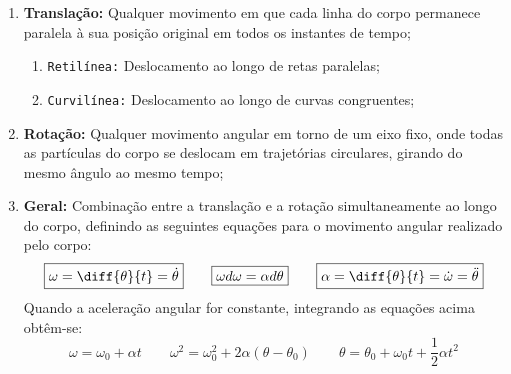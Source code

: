 \documentclass{article}
\begin{document}
                \begin{enumerate}[rightmargin = \leftmargin]
                    \item \textbf{Translação:} Qualquer movimento em que cada linha do corpo permanece paralela à sua posição original em todos os instantes de tempo;
                        \begin{enumerate}[rightmargin = \leftmargin, noitemsep]
                            \item \texttt{Retilínea:} Deslocamento ao longo de retas paralelas;
                            \item \texttt{Curvilínea:} Deslocamento ao longo de curvas congruentes;
                        \end{enumerate}

                    \item \textbf{Rotação:} Qualquer movimento angular em torno de um eixo fixo, onde todas as partículas do corpo se deslocam em trajetórias circulares, girando do mesmo ângulo ao mesmo tempo;

                    \item \textbf{Geral:} Combinação entre a translação e a rotação simultaneamente ao longo do corpo, definindo as seguintes equações para o movimento angular realizado pelo corpo:
                        \begin{equation}
                            \boxed{
                                \omega = \diff{\theta}{t} = \dot{\theta}
                            }
                            \qquad
                            \boxed{
                                \omega d \omega =\alpha d\theta
                            }
                            \qquad
                            \boxed{
                                \alpha = \diff{\theta}{t} = \dot{\omega} = \ddot{\theta}
                            }
                        \end{equation}
                    Quando a aceleração angular for constante, integrando as equações acima obtêm-se:
                        \begin{equation}
                            \boxed{
                                \omega = \omega_{0} + \alpha t
                            }
                            \qquad
                            \boxed{
                                \omega^{2} = \omega^{2}_{0} + 2\alpha(\theta - \theta_{0})
                            }
                            \qquad
                            \boxed{
                                \theta = \theta_{0} + \omega_{0} t + \frac{1}{2}\alpha t^{2}
                            }
                        \end{equation}
                \end{enumerate}
\end{document}
